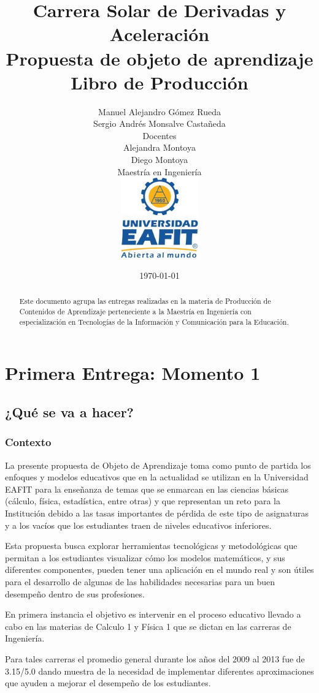 \documentclass[twoside,letterpaper,11pt]{report}
\title{
Carrera Solar de Derivadas y Aceleración\\
Propuesta de objeto de aprendizaje\\[0.5cm]
Libro de Producción}
\date{\today}
\author{
	Manuel Alejandro Gómez Rueda\\
	Sergio Andrés Monsalve Castañeda \\[2cm]
	Docentes\\[0.5cm]
	Alejandra Montoya\\
	Diego Montoya\\[1cm]
	Maestría en Ingeniería \\[1cm]
	\includegraphics[width=0.25\textwidth]{aux/logo_eafit}
}
\begin{document}
\maketitle

\tableofcontents
\begin{abstract}
Este documento agrupa las entregas realizadas en la materia de Producción de Contenidos de Aprendizaje perteneciente a la Maestría en Ingeniería con especialización en Tecnologías de la Información y Comunicación para la Educación.
\end{abstract}

\chapter{Primera Entrega: Momento 1}

\section{¿Qué se va a hacer?}

\subsection{Contexto} %
\label{sub:contexto}

La presente propuesta de Objeto de Aprendizaje toma como punto de partida los enfoques y modelos educativos que en la actualidad se utilizan en la Universidad EAFIT para la enseñanza de temas que se enmarcan en las ciencias básicas (cálculo, física, estadística, entre otras) y que representan un reto para la Institución debido a las tasas importantes de pérdida de este tipo de asignaturas y a los vacíos que los estudiantes traen de niveles educativos inferiores.

Esta propuesta busca explorar herramientas tecnológicas y metodológicas que permitan a los estudiantes visualizar cómo los modelos matemáticos, y sus diferentes componentes, pueden tener una aplicación en el mundo real y son útiles para el desarrollo de algunas de las habilidades necesarias para un buen desempeño dentro de sus profesiones.

En primera instancia el objetivo es intervenir en el proceso educativo llevado a cabo en las materias de Calculo 1 y Física 1 que se dictan en las carreras de Ingeniería. 

Para tales carreras el promedio general durante los años del 2009 al 2013 fue de 3.15/5.0 dando muestra de la necesidad de implementar diferentes aproximaciones que ayuden a mejorar el desempeño de los estudiantes. 
\end{document}
